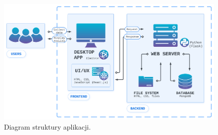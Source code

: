 \documentclass[12pt,a4paper,twoside]{article}
\begin{document}
\begin{figure}[h!]
\centering
\includegraphics[width=\textwidth]{img/archi2.pdf}
\caption{Diagram struktury aplikacji.}
\end{figure}\par
\end{document}
